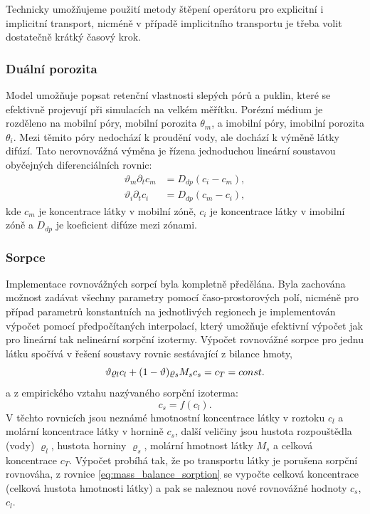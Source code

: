 Technicky umožňujeme použití 
metody štěpení operátoru pro explicitní i implicitní transport, nicméně v 
případě implicitního transportu je třeba volit dostatečně krátký časový krok.

\subsubsection{Duální porozita}
Model umožňuje popsat retenční vlastnosti slepých pórů a puklin, které se 
efektivně projevují při simulacích na velkém měřítku. Porézní médium je 
rozděleno na mobilní póry, mobilní porozita $\theta_m$, a imobilní póry, 
imobilní porozita $\theta_i$. Mezi těmito póry nedochází k proudění vody, ale 
dochází k výměně látky difúzí. Tato nerovnovážná výměna je řízena jednoduchou 
lineární soustavou obyčejných diferenciálních rovnic:
\begin{align}
    \vartheta_m \partial_t c_m &= D_{dp} ( c_i - c_m), 
\label{eqn:dual_porosity_ode1}\\
    \vartheta_i \partial_t c_i &= D_{dp} ( c_m - c_i), 
\label{eqn:dual_porosity_ode2}
\end{align}
kde $c_m$ je koncentrace látky v mobilní zóně, $c_i$ je koncentrace látky v 
imobilní zóně a $D_{dp}$ je koeficient difúze mezi zónami.


\subsubsection{Sorpce}
Implementace rovnovážných sorpcí byla kompletně předělána. Byla zachována 
možnost zadávat všechny parametry pomocí časo-prostorových polí, nicméně pro 
případ parametrů konstantních na jednotlivých regionech je implementován výpočet 
pomocí předpočítaných interpolací, který umožňuje efektivní výpočet jak pro 
lineární tak nelineární sorpční izotermy. Výpočet rovnovážné sorpce pro jednu 
látku spočívá v řešení soustavy rovnic sestávající z bilance hmoty,
\begin{equation}
\label{eq:mass_balance_sorption}
\vartheta \varrho_l c_l + (1-\vartheta) \varrho_s M_s c_s = c_T = const.
\end{equation}
a z empirického vztahu nazývaného sorpční izoterma:
\[
    c_s=f(c_l).
\]
V těchto rovnicích jsou neznámé hmotnostní koncentrace látky v roztoku $c_l$ a 
molární koncentrace látky v hornině $c_s$, další veličiny jsou hustota 
rozpouštědla (vody) $\varrho_l$, hustota horniny $\varrho_s$, molární hmotnost 
látky $M_s$ a celková koncentrace $c_T$. Výpočet probíhá tak, že po transportu 
látky je porušena sorpční rovnováha, z rovnice \eqref{eq:mass_balance_sorption} 
se vypočte celková koncentrace (celková hustota hmotnosti látky) a pak se 
naleznou nové rovnovážné hodnoty $c_s$, $c_l$.


